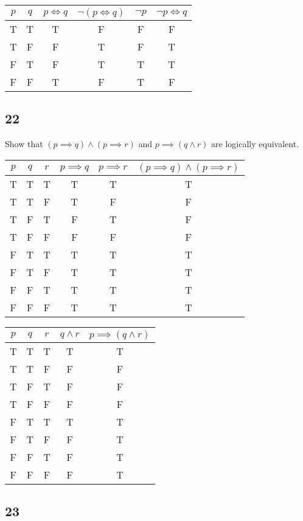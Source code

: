 \documentclass{article}
\begin{document}
\begin{tabular}{ | c | c | c | c | c | c | }
	$ p $ & $ q $ & $ p \iff q $ & $ \neg ( p \iff q ) $ & $ \neg p $ & $ \neg p \iff q $ \\
	\hline
	T & T & T & F & F & F \\
	T & F & F & T & F & T \\
	F & T & F & T & T & T \\
	F & F & T & F & T & F
\end{tabular}

\subsection{22}

Show that $ ( p \implies q ) \land ( p \implies r ) $ and $ p \implies ( q \land r ) $ are logically equivalent.

\begin{tabular}{ | c | c | c | c | c | c | }
	$ p $ & $ q $ & $ r $ & $ p \implies q $ & $ p \implies r $ & $ ( p \implies q ) \land ( p \implies r ) $ \\
	\hline
	T & T & T & T & T & T \\
	T & T & F & T & F & F \\
	T & F & T & F & T & F \\
	T & F & F & F & F & F \\
	F & T & T & T & T & T \\
	F & T & F & T & T & T \\
	F & F & T & T & T & T \\
	F & F & F & T & T & T \\
\end{tabular}

\begin{tabular}{ | c | c | c | c | c | }
	$ p $ & $ q $ & $ r $ & $ q \land r $ & $ p \implies ( q \land r ) $ \\
	\hline
	T & T & T & T & T \\
	T & T & F & F & F \\
	T & F & T & F & F \\
	T & F & F & F & F \\
	F & T & T & T & T \\
	F & T & F & F & T \\
	F & F & T & F & T \\
	F & F & F & F & T \\
\end{tabular}

\subsection{23}
\end{document}
